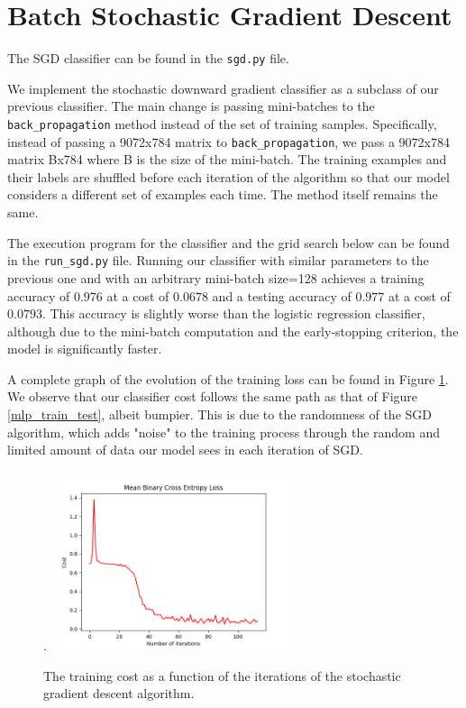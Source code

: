 \documentclass{article}
\newcommand{\code}{\texttt}
\begin{document}
\section{Batch Stochastic Gradient Descent}
The SGD classifier can be found in the \code{sgd.py} file.

We implement the stochastic downward gradient classifier as a subclass of our previous classifier. The main change is passing mini-batches to the \code{back\_propagation} method instead of the set of training samples. Specifically, instead of passing a 9072x784 matrix to \code{back\_propagation}, we pass a 9072x784 matrix Bx784 where B is the size of the mini-batch. The training examples and their labels are shuffled before each iteration of the algorithm so that our model considers a different set of examples each time. The method itself remains the same.
	
The execution program for the classifier and the grid search below can be found in the \code{run\_sgd.py} file. Running our classifier with similar parameters to the previous one and with an arbitrary mini-batch size=128 achieves a training accuracy of $0.976$ at a cost of $0.0678$ and a testing accuracy of $0.977$ at a cost of $0.0793$. This accuracy is slightly worse than the logistic regression classifier, although due to the mini-batch computation and the early-stopping criterion, the model is significantly faster.
	
A complete graph of the evolution of the training loss can be found in Figure \ref{sgd_train_test}. We observe that our classifier cost follows the same path as that of Figure \ref{mlp_train_test}, albeit bumpier. This is due to the randomness of the SGD algorithm, which adds "noise" to the training process through the random and limited amount of data our model sees in each iteration of SGD.

\begin{figure}[H].
	\includegraphics[width=7cm]{sgd_error.png}
	\centering
	\caption{The training cost as a function of the iterations of the stochastic gradient descent algorithm.}
	\label{sgd_train_test}
\end{figure}
\end{document}
